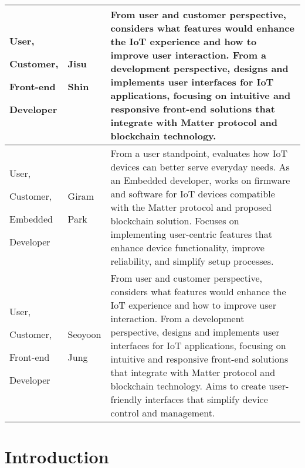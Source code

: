 \documentclass[conference]{IEEEtran}
\begin{document}
\begin{table}
	\def\arraystretch{1.24} \small
	\begin{tabular}{|p{1.8cm}|p{1.4cm}|p{4.4cm}|}
		\hline
		User, \par Customer, \par Front-end \par Developer & Jisu \par Shin    & From user and customer perspective, considers what features would enhance the IoT experience and how to improve user interaction. From a development perspective, designs and implements user interfaces for IoT applications, focusing on intuitive and responsive front-end solutions that integrate with Matter protocol and blockchain technology.                                                                                      \\
		\hline
		User, \par Customer, \par Embedded \par Developer  & Giram \par Park   & From a user standpoint, evaluates how IoT devices can better serve everyday needs. As an Embedded developer, works on firmware and software for IoT devices compatible with the Matter protocol and proposed blockchain solution. Focuses on implementing user-centric features that enhance device functionality, improve reliability, and simplify setup processes.                                                                       \\
		\hline
		User, \par Customer, \par Front-end \par Developer & Seoyoon \par Jung & From user and customer perspective, considers what features would enhance the IoT experience and how to improve user interaction. From a development perspective, designs and implements user interfaces for IoT applications, focusing on intuitive and responsive front-end solutions that integrate with Matter protocol and blockchain technology. Aims to create user-friendly interfaces that simplify device control and management. \\
		\hline
	\end{tabular}
\end{table}

\section{Introduction}
\end{document}
